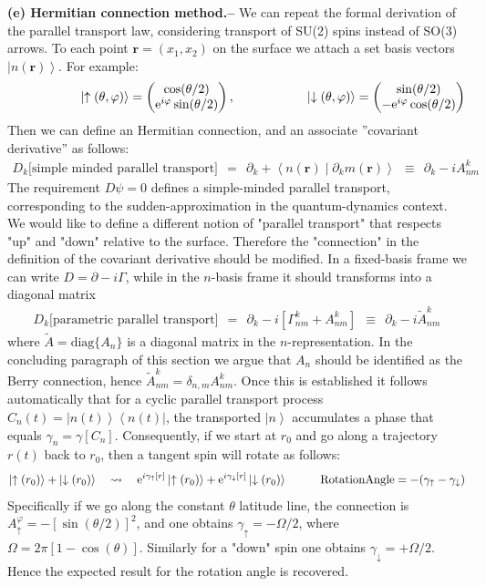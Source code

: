 \documentclass[onecolumn,fleqn]{revtex4}
\newcommand{\eexp}{\mathrm{e}^}
\newcommand{\amatrix}[1]{\begin{matrix} #1 \end{matrix}}
\newcommand{\bra}[1]{\left\langle #1 \right|}
\newcommand{\ket}[1]{\left| #1 \right\rangle}
\newcommand{\Braket}[2]{\left\langle #1 \middle| #2 \right\rangle}
\newcommand{\beq}{\begin{eqnarray}}
\newcommand{\eeq}{\end{eqnarray}}
\begin{document}
{\bf (e) Hermitian connection method.-- } 
We can repeat the formal derivation of the parallel transport law, considering transport of  SU(2) spins instead of SO(3) arrows.
To each point ${\bm{r}=(x_1,x_2)}$ on the surface we attach a set basis vectors $\ket{n(\bm{r})}$. 
For example:    
\beq
\hspace*{2cm}
\ket{\uparrow(\theta,\varphi)} = \left(\amatrix{\cos(\theta/2) \\ \eexp{i\varphi}\sin(\theta/2)}\right),
\hspace*{2cm}
\ket{\downarrow(\theta,\varphi)} = \left(\amatrix{\sin(\theta/2) \\ -\eexp{i\varphi}\cos(\theta/2)}\right)
\eeq
Then we can define an Hermitian connection, and an associate ”covariant derivative” as follows: 
\beq
D_k\text{[simple minded parallel transport]} 
\ \ = \ \ \partial_k + \Braket{n(\bm{r})}{\partial_k m(\bm{r})} 
\ \ \equiv \ \ \partial_k -iA_{nm}^k  
\eeq
The requirement $D\psi=0$ defines a simple-minded parallel transport, 
corresponding to the sudden-approximation in the quantum-dynamics context. 
We would like to define a different notion of "parallel transport" 
that respects "up" and "down" relative to the surface. 
Therefore the "connection" in the definition of the covariant derivative
should be modified. In a fixed-basis frame we can write ${D=\partial-i\Gamma}$, 
while in the $n$-basis frame it should transforms into a diagonal matrix 
\beq
D_k\text{[parametric parallel transport]} 
\ \ = \ \ \partial_k -i \left[\Gamma_{nm}^{k}+A^k_{nm}\right] 
\ \ \equiv \ \  \partial_k - i\tilde{A}_{nm}^k
\eeq
where $\tilde{A}=\text{diag}\{A_n\}$ is a diagonal matrix in the $n$-representation.
In the concluding paragraph of this section we argue 
that $A_n$ should be identified as the Berry connection, 
hence ${\tilde{A}_{nm}^k=\delta_{n,m}A^k_{nm}}$.   
Once this is established it follows automatically that 
for a cyclic parallel transport process ${C_n(t)=\ket{n(t)}\!\bra{n(t)}}$, 
the transported $\ket{n}$ accumulates a phase that equals ${\gamma_n=\gamma[C_n]}$.  
Consequently, if we start at ${r_0}$ and go along a trajectory $r(t)$ back to ${r_0}$, 
then a tangent spin will rotate as follows:
\beq
\ket{\uparrow(r_0)}+\ket{\downarrow(r_0)} 
\ \ \  \leadsto \ \ \ 
\eexp{i\gamma_{\uparrow}[r]}\ket{\uparrow(r_0)}+\eexp{i\gamma_{\downarrow}[r]}\ket{\downarrow(r_0)}
\hspace*{1cm}
\text{RotationAngle} = - (\gamma_{\uparrow}-\gamma_{\downarrow}) 
\eeq
Specifically if we go along the constant $\theta$ latitude line, 
the connection is ${A_{\uparrow}^{\varphi}=-[\sin(\theta/2)]^2}$, 
and one obtains ${\gamma_{\uparrow}=-\Omega/2}$, where ${\Omega=2\pi[1{-}\cos(\theta)]}$.   
Similarly for a "down" spin  one obtains ${\gamma_{\downarrow}=+\Omega/2}$. 
Hence the expected result for the rotation angle is recovered. 
\end{document}
